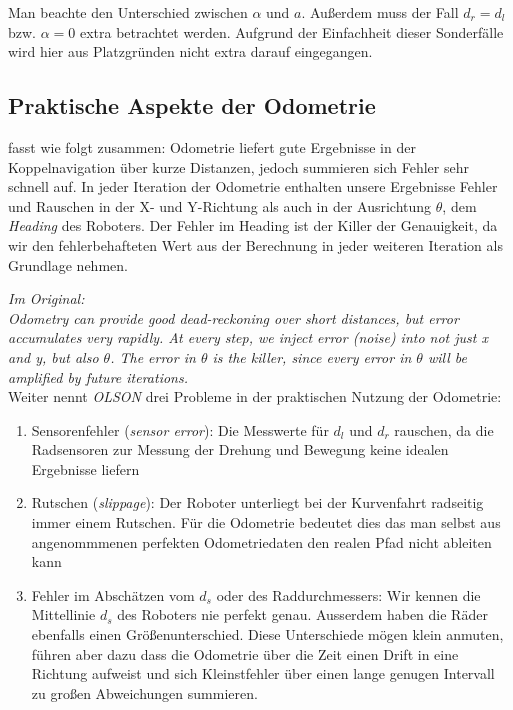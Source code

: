 \documentclass[11pt,a4paper]{article}
\begin{document}
Man beachte den Unterschied zwischen $\alpha$ und $a$. Außerdem muss der Fall $d_r = d_l$ bzw. $\alpha = 0$ extra betrachtet werden. Aufgrund der Einfachheit 
dieser Sonderfälle wird hier aus Platzgründen nicht extra darauf eingegangen.

\subsection*{Praktische Aspekte der Odometrie}

\cite{olson2004primer} fasst wie folgt zusammen:
Odometrie liefert gute Ergebnisse in der Koppelnavigation über kurze Distanzen, jedoch summieren sich Fehler sehr schnell auf.
In jeder Iteration der Odometrie enthalten unsere Ergebnisse Fehler und Rauschen in der X- und Y-Richtung als auch in der Ausrichtung $\theta$, dem \textit{Heading}
des Roboters. Der Fehler im Heading ist der Killer der Genauigkeit, da wir den fehlerbehafteten Wert aus der Berechnung in jeder weiteren Iteration als Grundlage nehmen.

\textit{Im Original: \\
Odometry can provide good dead-reckoning over short distances, but error accumulates very
rapidly. At every step, we inject error (noise) into not just x and y, but also $\theta$. The error
in $\theta$ is the killer, since every error in $\theta$ will be amplified by future iterations.} \vspace{5mm} \\

Weiter nennt \textit{OLSON} drei Probleme in der praktischen Nutzung der Odometrie:
\begin{enumerate}
  \item Sensorenfehler (\textit{sensor error}):
  Die Messwerte für $d_l$ und $d_r$ rauschen, da die Radsensoren zur Messung der Drehung und Bewegung keine idealen Ergebnisse liefern
  \item Rutschen (\textit{slippage}):
  Der Roboter unterliegt bei der Kurvenfahrt radseitig immer einem Rutschen. Für die Odometrie bedeutet dies das man selbst aus angenommmenen perfekten Odometriedaten
  den realen Pfad nicht ableiten kann
  \item Fehler im Abschätzen vom $d_s$ oder des Raddurchmessers:
  Wir kennen die Mittellinie $d_s$ des Roboters nie perfekt genau. Ausserdem haben die Räder ebenfalls einen Größenunterschied. Diese Unterschiede mögen klein 
  anmuten, führen aber dazu dass die Odometrie über die Zeit einen Drift in eine Richtung aufweist und sich Kleinstfehler über einen lange genugen Intervall zu großen
  Abweichungen summieren. 
\end{enumerate}
\end{document}
